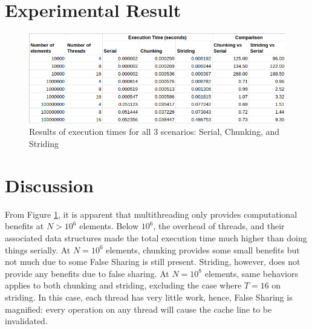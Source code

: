 \documentclass[letterpaper, 11pt]{article}
\begin{document}
\section{Experimental Result}

\begin{figure}[htb!]
	\centering
	\includegraphics[width=1.0\linewidth]{result.png}
	\caption{Results of execution times for all 3 scenarios: Serial, Chunking, and Striding}
	\label{fig1}
\end{figure}

\newpage

\section{Discussion}

From Figure \ref{fig1}, it is apparent that multithreading only provides computational benefits at $N > 10^6$ elements. Below $10^6$, the overhead of threads, and their associated data structures made the total execution time much higher than doing things serially. At $N = 10^6$ elements, chunking provides some small benefits but not much due to some False Sharing is still present. Striding, however, does not provide any benefits due to false sharing. At $N = 10^8$ elements, same behaviors applies to both chunking and striding, excluding the case where $T = 16$ on striding. In this case, each thread has very little work, hence, False Sharing is magnified: every operation on any thread will cause the cache line to be invalidated.
\end{document}
